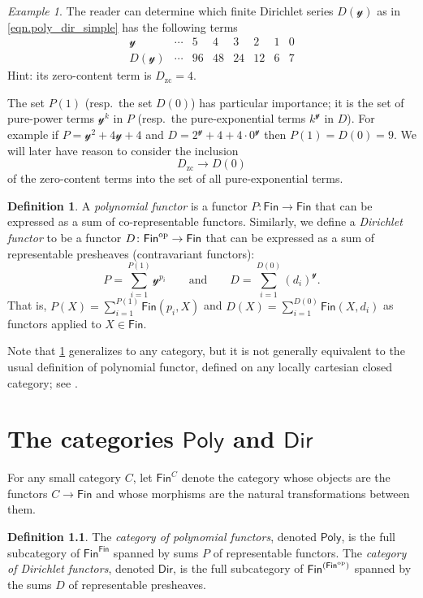 \documentclass[11pt, article, one side]{memoir}
\theoremstyle{theorem}
\theoremstyle{definition}
\newtheorem{definition}[section]{Definition}
\theoremstyle{remark}
\newtheorem{example}[section]{Example}
\newcommand{\Cat}[1]{\mathsf{#1}}%
\newcommand{\op}{^\tn{op}}
\newcommand{\tn}[1]{\textnormal{#1}}
\newcommand{\fin}{\Cat{Fin}}
\newcommand{\zero}[1]{#1_\text{zc}}
\newcommand{\yon}{\mathcal{y}}
\newcommand{\poly}{\Cat{Poly}}
\newcommand{\dir}{\Cat{Dir}}
\newcommand{\mdot}{{\cdot}}
\newcommand{\qqand}{\qquad\text{and}\qquad}
\begin{document}
\begin{example}
The reader can determine which finite Dirichlet series $D(\yon)$ as in \cref{eqn.poly_dir_simple} has the following terms
\[
\begin{array}{c|ccccccc}
\yon&
\cdots&
5&
4&
3&
2&
1&
0
\\\hline
D(\yon)&
\cdots&
96&
48&
24&
12&
6&
7
\end{array}
\]
Hint: its zero-content term is $\zero{D}=4$.
\end{example}

The set $P(1)$ (resp.\ the set $D(0)$) has particular importance; it is the set of pure-power terms $\yon^k$ in $P$ (resp.\ the pure-exponential terms $k^\yon$ in $D$). For example if $P=\yon^2+4\yon+4$ and $D=2^\yon+4+4\mdot0^\yon$ then $P(1)=D(0)=9$. We will later have reason to consider the inclusion
\begin{equation}\label{eqn.zerocontent}
\zero{D}\to D(0)
\end{equation}
of the zero-content terms into the set of all pure-exponential terms.

\begin{definition}\label{def.poly_dir_obs}
A \emph{polynomial functor} is a functor $P\colon\fin\to\fin$ that can be expressed as a sum of co-representable functors. Similarly, we define a \emph{Dirichlet functor} to be a functor $D\colon\fin\op\to\fin$ that can be expressed as a sum of representable presheaves (contravariant functors):
\begin{equation}\label{eqn.finite_sum}
  P=\sum_{i=1}^{P(1)}\yon^{p_i}
  \qqand
  D=\sum_{i=1}^{D(0)}(d_i)^\yon.
\end{equation}
That is, $P(X)=\sum_{i=1}^{P(1)}\fin(p_i,X)$ and $D(X)=\sum_{i=1}^{D(0)}\fin(X,d_i)$ as functors applied to $X\in\fin$.
\end{definition}

Note that \cref{def.poly_dir_obs} generalizes to any category, but it is not generally equivalent to the usual definition of polynomial functor, defined on any locally cartesian closed category; see \cite{GK:Polynomial.Functors}.

\chapter{The categories $\poly$ and $\dir$}

For any small category $C$, let $\fin^C$ denote the category whose objects are the functors $C\to\fin$ and whose morphisms are the natural transformations between them.
\begin{definition}\label{def.poly_dir}
The \emph{category of polynomial functors}, denoted $\poly$, is the full subcategory of $\fin^\fin$ spanned by sums $P$ of representable functors. The \emph{category of Dirichlet functors}, denoted $\dir$, is the full subcategory of $\fin^{(\fin\op)}$ spanned by the sums $D$ of representable presheaves.
\end{definition}
\end{document}
